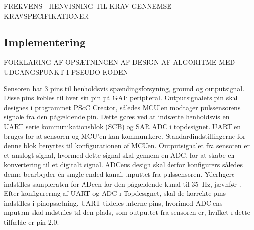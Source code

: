 FREKVENS - HENVISNING TIL KRAV
GENNEMSE KRAVSPECIFIKATIONER


\subsection{Implementering}
FORKLARING AF OPSÆTNINGEN AF DESIGN AF ALGORITME MED UDGANGSPUNKT I PSEUDO KODEN

Sensoren har 3 pins til henholdsvis spændingsforsyning, ground og outputsignal. Disse pins kobles til hver sin pin på GAP peripheral. Outputsignalets pin skal designes i programmet PSoC Creator, således MCU'en modtager pulssensorens signale fra den pågældende pin. Dette gøres ved at indsætte henholdsvis en UART serie kommunikationsblok (SCB) og SAR ADC i topdesignet. UART'en bruges for at sensoren og MCU'en kan kommunikere. Standardindstillingerne for denne blok benyttes til konfigurationen af MCUen. \newline
Outputsignalet fra sensoren er et analogt signal, hvormed dette signal skal gennem en ADC, for at skabe en konvertering til et digitalt signal. ADCens design skal derfor konfigurers således denne bearbejder én single ended kanal, inputtet fra pulssensoren. Yderligere indstilles sampleraten for ADcen for den pågældende kanal til 35~Hz, jævnfør . \\
Efter konfigurering af UART og ADC i Topdesignet, skal de korrekte pins indstilles i pinopsætning. UART tildeles interne pins, hvorimod ADC'ens inputpin skal indstilles til den plads, som outputtet fra sensoren er, hvilket i dette tilfælde er pin 2.0. 


